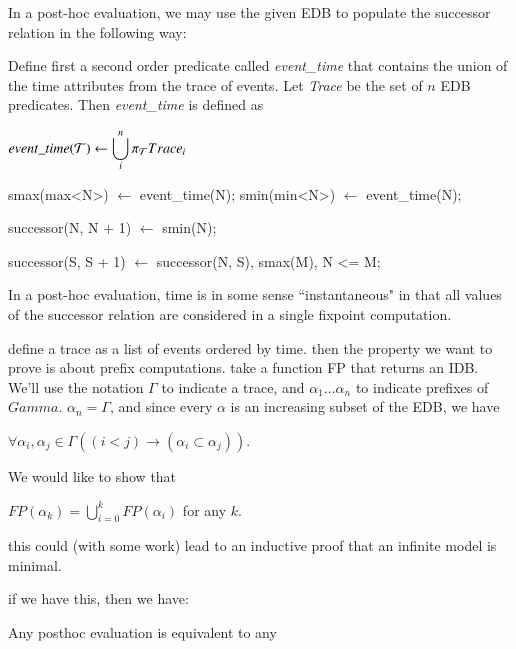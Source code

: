 In a post-hoc evaluation, we may use the given EDB to populate the successor relation in the following way:

Define first a second order predicate called \emph{event\_time} 
that contains the union of the time attributes from the trace of events. Let \emph{Trace} be the set of $n$ EDB predicates.  
Then \emph{event\_time} is defined as

$event\_time(\Tau) \leftarrow \displaystyle\bigcup_{i}^n \pi_{\Tau}Trace_{i}$

\begin{Dedalus}
smax(max<N>) \(\leftarrow\) event\_time(N);
smin(min<N>) \(\leftarrow\) event\_time(N);

successor(N, N + 1) \(\leftarrow\) smin(N);

successor(S, S + 1) \(\leftarrow\) 
    successor(N, S),
    smax(M),
    N <= M;
\end{Dedalus}

In a post-hoc evaluation, time is in some sense ``instantaneous" in that all values of the successor relation are considered in a single
fixpoint computation.  


define a trace as a list of events ordered by time.  then the property we want to prove is about prefix computations.  take a function FP that returns an IDB.  We'll use 
the notation $\Gamma$ to indicate a trace, and $\alpha_{1} \ldots \alpha_{n}$ to indicate prefixes of  $Gamma$. $\alpha_{n} = \Gamma$, and since every
$\alpha$ is an increasing subset of the EDB, we have 

$\forall \alpha_{i}, \alpha_{j} \in \Gamma ((i < j) \to (\alpha_{i} \subset \alpha_{j}))$.

We would like to show that 

$FP(\alpha_{k}) =  \displaystyle \bigcup_{i=0}^{k} FP(\alpha_{i})$ for any $k$.  

this could (with some work) lead to an inductive proof
that an infinite model is minimal.



if we have this, then we have:

Any posthoc evaluation is equivalent to any 
